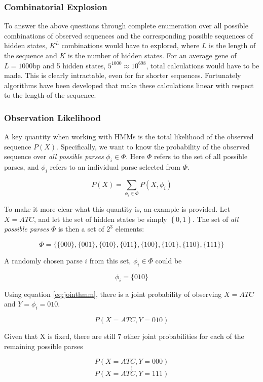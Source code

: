 \subsubsection{Combinatorial Explosion}
To answer the above questions through complete enumeration over all possible combinations of observed sequences and the corresponding possible sequences of hidden states, $K^L$ combinations would have to explored, where $L$ is the length of the sequence and $K$ is the number of hidden states. For an average gene of $L=1000$bp and 5 hidden states, $5^{1000}\approx10^{698}$, total calculations would have to be made. This is clearly intractable, even for far shorter sequences. Fortunately algorithms have been developed that make these calculations linear with respect to the length of the sequence.
\subsubsection{Observation Likelihood}
A key quantity when working with HMMs is the total likelihood of the observed sequence $P(X)$. Specifically, we want to know the probability of the observed sequence over \emph{all possible parses} $\phi_i \in \Phi$. Here $\Phi$ refers to the set of all possible parses, and $\phi_i$ refers to an individual parse selected from $\Phi$. 

\begin{equation}
 P(X) = \sum_{\phi_i \in \Phi}{P(X,\phi_i)}  
\label{eq:partition}
\end{equation}

To make it more clear what this quantity is, an example is provided. Let $X = ATC$, and let the set of hidden states be simply $\left\{0,1\right\}$. The set of \emph{all possible parses} $\Phi$ is then a set of $2^3$ elements:

$$\Phi = \{\{000\},\{001\},\{010\},\{011\},\{100\},\{101\},\{110\},\{111\}\}$$

A randomly chosen parse $i$ from this set, $\phi_i \in \Phi$ could be

$$\phi_i = \{010\}$$

Using equation \ref{eq:jointhmm}, there is a joint probability of observing $X=ATC$ and $Y = \phi_i = 010$.

$$P(X=ATC,Y=010)$$

Given that X is fixed, there are still 7 other joint probabilities for each of the remaining possible parses

$$P(X=ATC,Y=000)$$
$$\vdots$$
$$P(X=ATC,Y=111)$$

